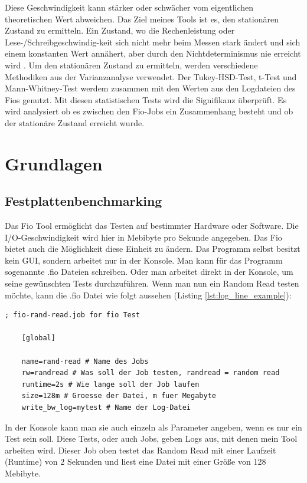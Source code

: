 \documentclass{article}
\begin{document}
Diese Geschwindigkeit kann stärker oder schwächer vom eigentlichen theoretischen Wert abweichen. 
Das Ziel meines Tools ist es, den stationären Zustand zu ermitteln.
Ein Zustand, wo die Rechenleistung oder Lese-/Schreibgeschwindig-keit sich nicht mehr beim Messen stark ändert und sich einem konstanten Wert annähert, aber durch den Nichtdeterminismus nie erreicht wird \cite{vmsHotandCold}.
Um den stationären Zustand zu ermitteln, werden verschiedene Methodiken aus der Varianzanalyse verwendet. Der Tukey-HSD-Test, t-Test und Mann-Whitney-Test werdem zusammen mit den Werten aus den Logdateien des Fios genutzt. Mit diesen statistischen Tests wird die Signifikanz überprüft. Es wird analysiert ob es zwischen den Fio-Jobs ein Zusammenhang besteht und ob der stationäre Zustand erreicht wurde.  

\newpage
\section{Grundlagen}
\subsection{Festplattenbenchmarking}
Das Fio Tool ermöglicht das Testen auf bestimmter Hardware oder Software. Die I/O-Geschwindigkeit wird hier in Mebibyte pro Sekunde angegeben. Das Fio bietet auch die Möglichkeit diese Einheit zu ändern.
Das Programm selbst besitzt kein GUI, sondern arbeitet nur in der Konsole. Man kann für das Programm sogenannte .fio Dateien schreiben. Oder man arbeitet direkt in der Konsole,
um seine gewünschten Tests durchzuführen.
Wenn man nun ein Random Read testen möchte, kann die .fio Datei wie folgt aussehen (Listing \ref{lst:log_line_example}):

\begin{lstlisting}[caption=Beispiel für eine .fio Datei (\# heißt Kommentar),label={lst:fio_file_example}]
    ; fio-rand-read.job for fio Test

    [global]

    name=rand-read # Name des Jobs
    rw=randread # Was soll der Job testen, randread = random read
    runtime=2s # Wie lange soll der Job laufen
    size=128m # Groesse der Datei, m fuer Megabyte
    write_bw_log=mytest # Name der Log-Datei
\end{lstlisting}
\bigskip
In der Konsole kann man sie auch einzeln als Parameter angeben, wenn es nur ein Test sein soll.
Diese Tests, oder auch Jobs, geben Logs aus, mit denen mein Tool arbeiten wird. Dieser Job oben testet das Random Read mit einer
Laufzeit (Runtime) von 2 Sekunden und liest eine Datei mit einer Größe von 128 Mebibyte.
\end{document}
